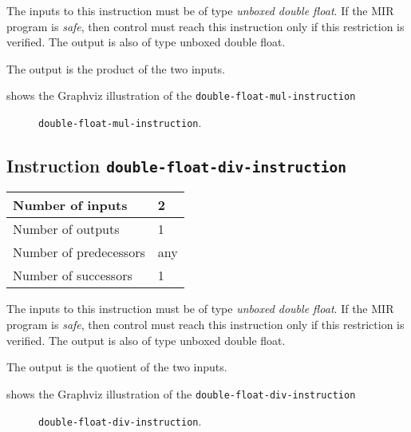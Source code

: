 The inputs to this instruction must be of type \emph{unboxed double
  float}.  If the MIR program is \emph{safe}, then control must reach
this instruction only if this restriction is verified.  The output is
also of type unboxed double float.

The output is the product of the two inputs.

 shows the Graphviz illustration of the
\texttt{double-float-mul-instruction}

\begin{figure}
\begin{center}
\end{center}
\caption{\label{fig-double-float-mul-instruction}
\texttt{double-float-mul-instruction}.}
\end{figure}

\subsection{Instruction \texttt{double-float-div-instruction}}
\label{mir-instruction-double-float-div}

\begin{tabular}{|l|l|}
\hline
Number of inputs & 2\\
\hline
Number of outputs & 1\\
\hline
Number of predecessors & any\\
\hline
Number of successors & 1\\
\hline
\end{tabular}

The inputs to this instruction must be of type \emph{unboxed double
  float}.  If the MIR program is \emph{safe}, then control must reach
this instruction only if this restriction is verified.  The output is
also of type unboxed double float.

The output is the quotient of the two inputs.

 shows the Graphviz illustration of the
\texttt{double-float-div-instruction}

\begin{figure}
\begin{center}
\end{center}
\caption{\label{fig-double-float-div-instruction}
\texttt{double-float-div-instruction}.}
\end{figure}

